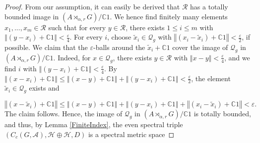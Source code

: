 \documentclass[a4paper,11pt,reqno]{amsart}
\numberwithin{equation}{section}
\numberwithin{equation}{section}
\theoremstyle{definition}
\theoremstyle{remark}
\theoremstyle{remark}
\begin{document}
\begin{proof}
From our assumption, it can easily be derived that $\mathcal{R}$ has
a totally bounded image in $(A\rtimes_{\alpha,r}G)/\mathbb{C}1$. We
hence find finitely many elements $x_{1},...,x_{m}\in\mathcal{R}$
such that for every $y\in\mathcal{R}$, there exists $1\leq i\leq m$
with $\left\Vert (y-x_{i})+\mathbb{C}1\right\Vert <\frac{\varepsilon}{4}$.
For every $i$, choose $\widetilde{x}_{i}\in\mathcal{Q}_{g}$ with
$\left\Vert (x_{i}-\widetilde{x}_{i})+\mathbb{C}1\right\Vert <\frac{\varepsilon}{2}$,
if possible. We claim that the $\varepsilon$-balls around the $\widetilde{x}_{i}+\mathbb{C}1$
cover the image of $\mathcal{Q}_{g}$ in $(A\rtimes_{\alpha,r}G)/\mathbb{C}1$.
Indeed, for $x\in\mathcal{Q}_{g}$, there exists $y\in\mathcal{R}$
with $\left\Vert x-y\right\Vert <\frac{\varepsilon}{4}$, and we find
$i$ with $\left\Vert (y-x_{i})+\mathbb{C}1\right\Vert <\frac{\varepsilon}{4}$.
By $\left\Vert (x-x_{i})+\mathbb{C}1\right\Vert \leq\left\Vert (x-y)+\mathbb{C}1\right\Vert +\left\Vert (y-x_{i})+\mathbb{C}1\right\Vert <\frac{\varepsilon}{2}$,
the element $\widetilde{x}_{i}\in\mathcal{Q}_{g}$ exists and

\[
\left\Vert (x-\widetilde{x}_{i})+\mathbb{C}1\right\Vert \leq\left\Vert (x-y)+\mathbb{C}1\right\Vert +\left\Vert (y-x_{i})+\mathbb{C}1\right\Vert +\left\Vert (x_{i}-\widetilde{x}_{i})+\mathbb{C}1\right\Vert <\varepsilon.
\]
The claim follows. Hence, the image of $\mathcal{Q}_{g}$ in $(A\rtimes_{\alpha,r}G)/\mathbb{C}1$
is totally bounded, and thus, by Lemma \ref{FiniteIndex}, the even spectral
triple $(C_{c}(G,\mathcal{A}),\mathcal{H}\oplus\mathcal{H},D)$ is a spectral metric space


\end{proof}
\end{document}
